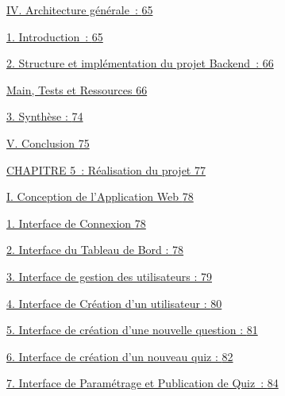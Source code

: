 \documentclass[12pt,a4paper,twoside]{report}
\begin{document}
\protect\hyperlink{architecture-guxe9nuxe9rale}{IV. Architecture
générale~: \protect\hyperlink{architecture-guxe9nuxe9rale}{65}}

\protect\hyperlink{introduction}{1. Introduction~:
\protect\hyperlink{introduction}{65}}

\protect\hyperlink{structure-et-impluxe9mentation-du-projet-backend}{2.
Structure et implémentation du projet Backend~:
\protect\hyperlink{structure-et-impluxe9mentation-du-projet-backend}{66}}

\protect\hyperlink{main-tests-et-ressources}{Main, Tests et Ressources
\protect\hyperlink{main-tests-et-ressources}{66}}

\protect\hyperlink{synthese}{3. Synthèse :
\protect\hyperlink{synthese}{74}}

\protect\hyperlink{conclusion-3}{V. Conclusion
\protect\hyperlink{conclusion-3}{75}}

\protect\hyperlink{section-7}{CHAPITRE 5~: Réalisation du projet
\protect\hyperlink{section-7}{77}}

\protect\hyperlink{conception-de-lapplication-web}{I. Conception de
l'Application Web
\protect\hyperlink{conception-de-lapplication-web}{78}}

\protect\hyperlink{interface-de-connexion}{1. Interface de Connexion
\protect\hyperlink{interface-de-connexion}{78}}

\protect\hyperlink{interface-du-tableau-de-bord}{2. Interface du Tableau
de Bord : \protect\hyperlink{interface-du-tableau-de-bord}{78}}

\protect\hyperlink{interface-de-gestion-des-utilisateurs}{3. Interface
de gestion des utilisateurs :
\protect\hyperlink{interface-de-gestion-des-utilisateurs}{79}}

\protect\hyperlink{interface-de-cruxe9ation-dun-utilisateur}{4.
Interface de Création d'un utilisateur :
\protect\hyperlink{interface-de-cruxe9ation-dun-utilisateur}{80}}

\protect\hyperlink{interface-de-cruxe9ation-dune-nouvelle-question}{5.
Interface de création d'une nouvelle question :
\protect\hyperlink{interface-de-cruxe9ation-dune-nouvelle-question}{81}}

\protect\hyperlink{interface-de-cruxe9ation-dun-nouveau-quiz}{6.
Interface de création d'un nouveau quiz :
\protect\hyperlink{interface-de-cruxe9ation-dun-nouveau-quiz}{82}}

\protect\hyperlink{interface-de-paramuxe9trage-et-publication-de-quiz}{7.
Interface de Paramétrage et Publication de Quiz~:
\protect\hyperlink{interface-de-paramuxe9trage-et-publication-de-quiz}{84}}
\end{document}
